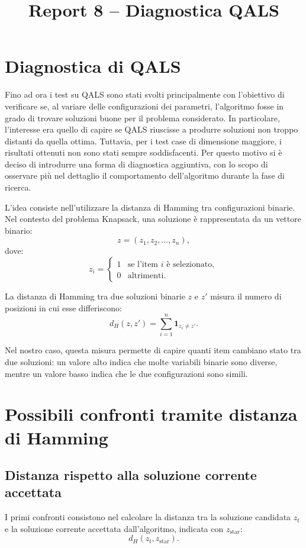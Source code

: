 \documentclass[a4paper,12pt]{article}
\title{Report 8 -- Diagnostica QALS}
\begin{document}
\maketitle

\newpage

\section{Diagnostica di QALS}

Fino ad ora i test su QALS sono stati svolti principalmente con l'obiettivo di verificare se, al variare delle configurazioni dei parametri, l'algoritmo 
fosse in grado di trovare soluzioni buone per il problema considerato. In particolare, l'interesse era quello di capire se QALS riuscisse a produrre soluzioni non troppo distanti da quella ottima.
Tuttavia, per i test case di dimensione maggiore, i risultati ottenuti non sono stati sempre soddisfacenti. Per questo motivo si è deciso di introdurre una forma di diagnostica aggiuntiva, 
con lo scopo di osservare più nel dettaglio il comportamento dell'algoritmo durante la fase di ricerca.

L'idea consiste nell'utilizzare la distanza di Hamming tra configurazioni binarie. Nel contesto del problema Knapsack, una soluzione è rappresentata da un vettore binario:
\[
z = (z_1, z_2, \dots, z_n),
\]
dove:
\[
z_i =
\begin{cases}
1 & \text{se l'item } i \text{ è selezionato},\\
0 & \text{altrimenti}.
\end{cases}
\]

La distanza di Hamming tra due soluzioni binarie \(z\) e \(z'\) misura il numero di posizioni in cui esse differiscono:
\[
d_H(z,z') = \sum_{i=1}^{n} \mathbf{1}_{z_i \neq z'}.
\]

Nel nostro caso, questa misura permette di capire quanti item cambiano stato tra due soluzioni: un valore alto indica che molte variabili binarie sono diverse,
mentre un valore basso indica che le due configurazioni sono simili.

\section{Possibili confronti tramite distanza di Hamming}

\subsection{Distanza rispetto alla soluzione corrente accettata}
I primi confronti consistono nel calcolare la distanza tra la soluzione candidata \(z_t\) e la soluzione corrente accettata dall'algoritmo, indicata con \(z_{\text{star}}\):
\[
d_H(z_t, z_{\text{star}}).
\]
\end{document}
